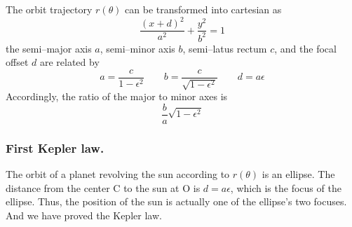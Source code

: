 \documentclass[../../../main.tex]{subfiles}
\begin{document}
The orbit trajectory $r(\theta)$ can be transformed into cartesian as 
\begin{equation*}
    \frac{(x+d)^2}{a^2  }+\frac{y^2 }{b^2 }=1
\end{equation*}
the semi–major axis $a$, semi–minor axis $b$, semi–latus rectum $c$, and the focal offset $d$ are related by
\begin{equation*}
    a=\frac{c }{1-\epsilon^2 }\qquad
    b=\frac{c }{\sqrt{1-\epsilon^2}}\qquad
    d=a\epsilon
\end{equation*}
Accordingly, the ratio of the major to minor axes is
\begin{equation*}
    \frac{b }{a }\sqrt{1-\epsilon^2}
\end{equation*}

\subsubsection{First Kepler law.} 
The orbit of a planet revolving the sun according to $r(\theta)$ is an ellipse.
The distance from the center C to the sun at O is $d = a\epsilon$, which is the focus of the ellipse.
Thus, the position of the sun is actually one of the ellipse's two focuses.
And we have proved the Kepler law.
\end{document}
